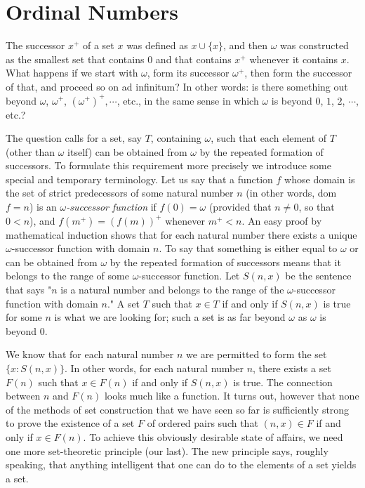 
\chapter{Ordinal Numbers} 

The successor $x^{+}$ of a set $x$ was defined as $x \cup \{ x \} $, and then $\omega$ was constructed as the smallest set that contains $0$ and that contains $x^{+}$ whenever it contains $x$. What happens if we start with $\omega$, form its successor $\omega^{+}$, then form the successor of that, and proceed so on ad infinitum? In other words: is there something out beyond $\omega$, $\omega^{+}$, $(\omega^{+})^{+}, \cdots$, etc., in the same sense in which $\omega$ is beyond $0$, $1$, $2$, $\cdots$, etc.? 

The question calls for a set, say $T$, containing $\omega$, such that each element of $T$ (other than $\omega$ itself) can be obtained from $\omega$ by the repeated formation of successors. To formulate this requirement more precisely we introduce some special and temporary terminology. Let us say that a function $f$ whose domain is the set of strict predecessors of some natural number $n$  (in other words, dom $f = n$) is an \textit{$\omega$-successor function} if $f(0) = \omega$ (provided that $n \neq 0$, so that $0 < n$), and $f(m^{+}) = (f(m))^{+}$ whenever $m^{+} < n$. An easy proof by mathematical induction shows that for each natural number there exists a unique $\omega$-successor function with domain $n$. To say that something is either equal to $\omega$ or can be obtained from $\omega$ by the repeated formation of successors means that it belongs to the range of some $\omega$-successor function. Let $S(n,x)$ be the sentence that says "$n$ is a natural number and belongs to the range of the $\omega$-successor function with domain $n$." A set $T$ such that $x \in T$ if and only if $S(n,x)$ is true for some $n$ is what we are looking for; such a set is as far beyond $\omega$ as $\omega$ is beyond $0$. 

We know that for each natural number $n$ we are permitted to form the set $\{ x: S(n,x) \}$. In other words, for each natural number $n$, there exists a set $F(n)$ such that $x \in F(n)$ if and only if $S(n,x)$ is true. The connection between $n$ and $F(n)$ looks much like a function. It turns out, however that none of the methods of set construction that we have seen so far is sufficiently strong to prove the existence of a set $F$ of ordered pairs such that $(n, x) \in F$ if and only if $x \in F(n)$. To achieve this obviously desirable state of affairs, we need one more set-theoretic principle (our last). The new principle says, roughly speaking, that anything intelligent that one can do to the elements of a set yields a set.

